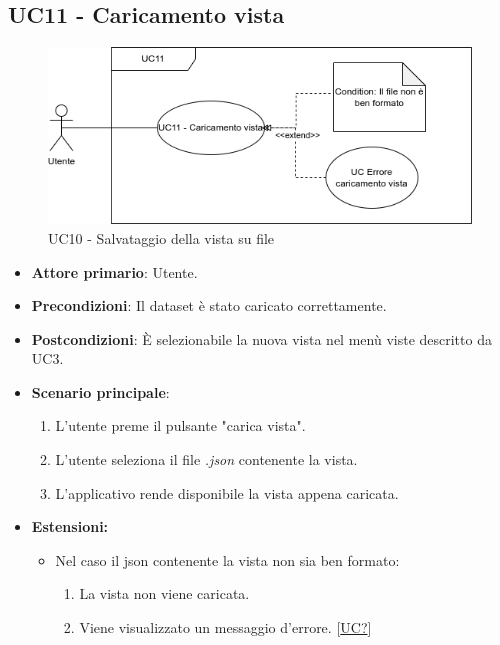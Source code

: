 \newpage

\subsection{UC11 - Caricamento vista}
\label{sec:UC11}
\begin{figure}[h!]
    \centering
    \includegraphics[scale=0.55]{../../assets/caricamento_vista.png}
    \caption{UC10 - Salvataggio della vista su file}
\end{figure}
\begin{itemize}
    \item \textbf{Attore primario}: Utente.
    \item \textbf{Precondizioni}: Il dataset è stato caricato correttamente.
    \item \textbf{Postcondizioni}: È selezionabile la nuova vista nel menù viste descritto da UC3.
    \item \textbf{Scenario principale}:
          \begin{enumerate}
              \item L'utente preme il pulsante "carica vista".
              \item L'utente seleziona il file \textit{.json} contenente la vista.
              \item L'applicativo rende disponibile la vista appena caricata.
          \end{enumerate}
    \item \textbf{Estensioni:}
    \begin{itemize}
        \item Nel caso il json contenente la vista non sia ben formato: \begin{enumerate}
            \item La vista non viene caricata.
            \item Viene visualizzato un messaggio d'errore. [\hyperref[sec:UC - Errore caricamento vista]{UC?}]
        \end{enumerate}
    \end{itemize}
\end{itemize}

